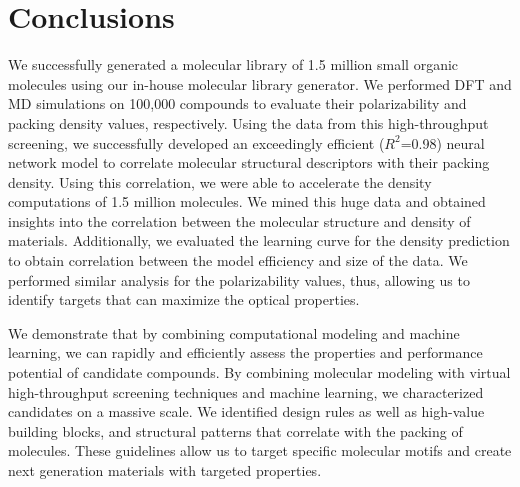 \section{Conclusions}
\label{sec:conclusions6} 

We successfully generated a molecular library of 1.5 million small organic molecules using our in-house molecular library generator. We performed DFT and MD simulations on 100,000 compounds to evaluate their polarizability and packing density values, respectively. Using the data from this high-throughput screening, we successfully developed an exceedingly efficient ($R^2$=0.98) neural network model to correlate molecular structural descriptors with their packing density. Using this correlation, we were able to accelerate the density computations of 1.5 million molecules. We mined this huge data and obtained insights into the correlation between the molecular structure and density of materials. Additionally, we evaluated the learning curve for the density prediction to obtain correlation between the model efficiency and size of the data. We performed similar analysis for the polarizability values, thus, allowing us to identify targets that can maximize the optical properties. 

We demonstrate that by combining computational modeling and machine learning, we can rapidly and efficiently assess the properties and performance potential of candidate compounds. By combining molecular modeling with virtual high-throughput screening techniques and machine learning, we characterized candidates on a massive scale. We identified design rules as well as high-value building blocks, and structural patterns that correlate with the packing of molecules. These guidelines allow us to target specific molecular motifs and create next generation materials with targeted properties.

